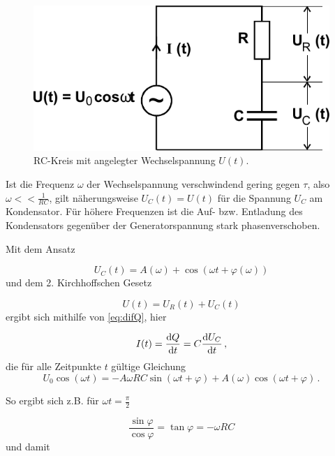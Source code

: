 \begin{figure}[H]
    \centering
    \includegraphics{figures/RC-Kreis Wechselspannung.pdf}
    \caption{RC-Kreis mit angelegter Wechselspannung $U(t)$\cite{ap08}.}
    \label{fig:sinspann}
\end{figure}

Ist die Frequenz $ω$ der Wechselspannung verschwindend gering gegen $τ$, also $ω << \frac{1}{RC}$, gilt näherungsweise $U_C(t) = U(t)$ für die Spannung $U_C$ am Kondensator.
Für höhere Frequenzen ist die Auf- bzw. Entladung des Kondensators gegenüber der Generatorspannung stark phasenverschoben.

Mit dem Ansatz

\begin{equation*}
    U_C(t) = A(ω) + \cos(ω t + \varphi(ω))
\end{equation*} und dem 2. Kirchhoffschen Gesetz

\begin{equation*}
    U(t) = U_R(t) + U_C(t)
\end{equation*} ergibt sich mithilfe von \eqref{eq:difQ}, hier

\begin{equation*}
    I(t) = \frac{\mathrm{d} Q}{\mathrm{d} t} = C \frac{\mathrm{d} U_C}{\mathrm{d} t} \,,
    \label{eq:It}
\end{equation*}
die für alle Zeitpunkte $t$ gültige Gleichung
\begin{equation}
    U_0 \cos(\omega t) = - A \omega R C  \sin(\omega t + \varphi) + A(\omega) \cos(\omega t + \varphi) \,.
    \label{eq:U_0omegagedöns}
\end{equation}

So ergibt sich z.B. für $\omega t = \frac{\pi}{2}$

\begin{equation*}
    \frac{\sin\varphi}{\cos\varphi} = \tan\varphi = -ω R C
\end{equation*} und damit 

